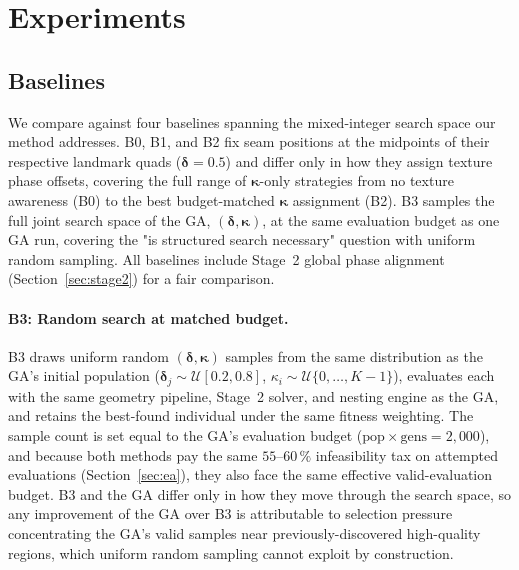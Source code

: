 \section{Experiments}
\label{sec:experiments}

\subsection{Baselines}
\label{sec:baselines}

We compare against four baselines spanning the mixed-integer search
space our method addresses.
B0, B1, and B2 fix seam positions at the midpoints of their respective
landmark quads ($\boldsymbol{\delta} = 0.5$) and differ only in how they
assign texture phase offsets, covering the full range of
$\boldsymbol{\kappa}$-only strategies from no texture awareness (B0) to
the best budget-matched $\boldsymbol{\kappa}$ assignment (B2).
B3 samples the full joint search space of the GA, $(\boldsymbol{\delta},
\boldsymbol{\kappa})$, at the same evaluation budget as one GA run,
covering the "is structured search necessary" question with uniform
random sampling.
All baselines include Stage~2 global phase alignment
(Section~\ref{sec:stage2}) for a fair comparison.

\paragraph{B3: Random search at matched budget.}
B3 draws uniform random $(\boldsymbol{\delta}, \boldsymbol{\kappa})$
samples from the same distribution as the GA's initial population
($\boldsymbol{\delta}_j \sim \mathcal{U}[0.2, 0.8]$,
$\kappa_i \sim \mathcal{U}\{0, \dots, K{-}1\}$), evaluates each with the
same geometry pipeline, Stage~2 solver, and nesting engine as the GA,
and retains the best-found individual under the same fitness weighting.
The sample count is set equal to the GA's evaluation budget
($\mathrm{pop} \times \mathrm{gens} = 2{,}000$), and because both methods
pay the same $55$--$60\,\%$ infeasibility tax on attempted evaluations
(Section~\ref{sec:ea}), they also face the same effective valid-evaluation
budget. B3 and the GA differ only in how they move through the search
space, so any improvement of the GA over B3 is attributable to selection
pressure concentrating the GA's valid samples near previously-discovered
high-quality regions, which uniform random sampling cannot exploit by
construction.

